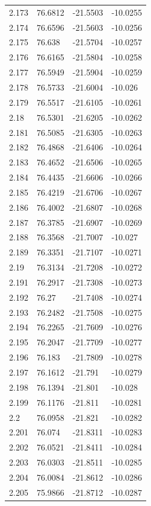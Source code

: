 \begin{tabular}{llll}
2.173 & 76.6812 & -21.5503 & -10.0255 \\
2.174 & 76.6596 & -21.5603 & -10.0256 \\
2.175 & 76.638 & -21.5704 & -10.0257 \\
2.176 & 76.6165 & -21.5804 & -10.0258 \\
2.177 & 76.5949 & -21.5904 & -10.0259 \\
2.178 & 76.5733 & -21.6004 & -10.026 \\
2.179 & 76.5517 & -21.6105 & -10.0261 \\
2.18 & 76.5301 & -21.6205 & -10.0262 \\
2.181 & 76.5085 & -21.6305 & -10.0263 \\
2.182 & 76.4868 & -21.6406 & -10.0264 \\
2.183 & 76.4652 & -21.6506 & -10.0265 \\
2.184 & 76.4435 & -21.6606 & -10.0266 \\
2.185 & 76.4219 & -21.6706 & -10.0267 \\
2.186 & 76.4002 & -21.6807 & -10.0268 \\
2.187 & 76.3785 & -21.6907 & -10.0269 \\
2.188 & 76.3568 & -21.7007 & -10.027 \\
2.189 & 76.3351 & -21.7107 & -10.0271 \\
2.19 & 76.3134 & -21.7208 & -10.0272 \\
2.191 & 76.2917 & -21.7308 & -10.0273 \\
2.192 & 76.27 & -21.7408 & -10.0274 \\
2.193 & 76.2482 & -21.7508 & -10.0275 \\
2.194 & 76.2265 & -21.7609 & -10.0276 \\
2.195 & 76.2047 & -21.7709 & -10.0277 \\
2.196 & 76.183 & -21.7809 & -10.0278 \\
2.197 & 76.1612 & -21.791 & -10.0279 \\
2.198 & 76.1394 & -21.801 & -10.028 \\
2.199 & 76.1176 & -21.811 & -10.0281 \\
2.2 & 76.0958 & -21.821 & -10.0282 \\
2.201 & 76.074 & -21.8311 & -10.0283 \\
2.202 & 76.0521 & -21.8411 & -10.0284 \\
2.203 & 76.0303 & -21.8511 & -10.0285 \\
2.204 & 76.0084 & -21.8612 & -10.0286 \\
2.205 & 75.9866 & -21.8712 & -10.0287 \\

\end{tabular}
